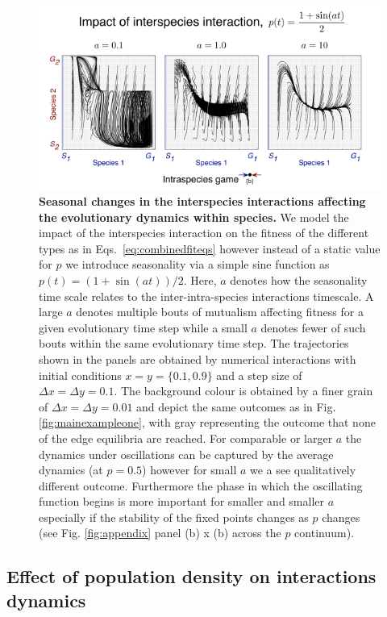 \documentclass[12pt]{article}
\begin{document}
\begin{figure}
\begin{center}
\includegraphics[width=\columnwidth]{Figures/oscillating_p_reduced.pdf}
\caption{\small{
\textbf{Seasonal changes in the interspecies interactions affecting the evolutionary dynamics within species.}
We model the impact of the interspecies interaction on the fitness of the different types as in Eqs.~\ref{eq:combinedfiteqs} however instead of a static value for $p$ we introduce seasonality via a simple sine function as $p(t) = (1+\sin(at))/2$.
Here, $a$ denotes how the seasonality time scale relates to the inter-intra-species interactions timescale.
A large $a$ denotes multiple bouts of mutualism affecting fitness for a given evolutionary time step while a small $a$ denotes fewer of such bouts within the same evolutionary time step.
The trajectories shown in the panels are obtained by numerical interactions with initial conditions $x = y = \{0.1,0.9\}$ and a step size of $\Delta x = \Delta y = 0.1$.
The background colour is obtained by a finer grain of $\Delta x = \Delta y = 0.01$ and depict the same outcomes as in Fig. \ref{fig:mainexampleone}, with gray representing the outcome that none of the edge equilibria are reached.
For comparable or larger $a$ the dynamics under oscillations can be captured by the average dynamics (at $p = 0.5$) however for small $a$ we a see qualitatively different outcome.
Furthermore the phase in which the oscillating function begins is more important for smaller and smaller $a$ especially if the stability of the fixed points changes as $p$ changes (see Fig. \ref{fig:appendix} panel (b) x (b) across the $p$ continuum).
 }
\label{fig:oscillations}
}
\end{center}
\end{figure}


\subsection{Effect of population density on interactions dynamics}
\end{document}
